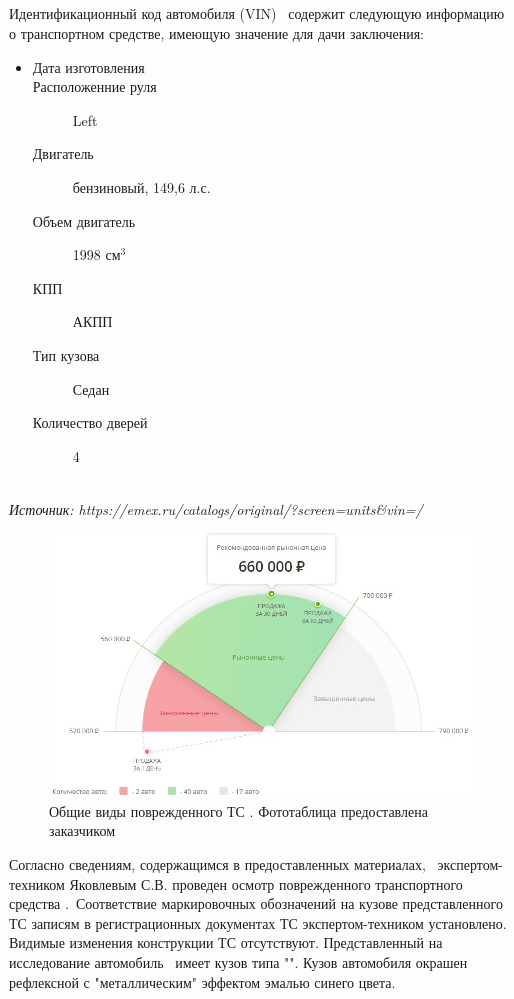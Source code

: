 	\subparagraph*{} Идентификационный код автомобиля (VIN)  \vin \, содержит следующую информацию о транспортном средстве, имеющую значение для 	дачи заключения:\\[3mm]
\noindent\parbox[]{10cm}{
\begin{itemize}
	\item[ ] 
	    \begin{description}
	\item[Дата изготовления] \hfill {}
	\item[Расположенние руля] \hfill Left
	\item[Двигатель] \hfill бензиновый, 149,6 л.с.
	\item[Объем двигатель] \hfill 1998 $ \text{см}^3 $
	\item[КПП] \hfill АКПП
	\item[Тип кузова] \hfill  Седан
	\item[Количество дверей] \hfill 4 
		\end{description}
\end{itemize}}\\%
\vspace{5mm}
\textit{Источник: https://emex.ru/catalogs/original/?screen=units\&vin=/}\\
  \begin{figure}[!h]
	\centering
	\includegraphics[width=0.98\linewidth]{images/1}
	\caption{{\footnotesize {Общие виды поврежденного ТС . Фототаблица предоставлена заказчиком}}}
	\label{ris:images/1}
\end{figure}
 
Согласно сведениям, содержащимся в предоставленных материалах, \osm \, экс\-пертом-техником Яковлевым С.В. проведен осмотр поврежденного транспортного средства \tc.\,
Соответствие маркировочных обозначений на кузове представленного ТС записям в регистрационных документах ТС экс\-пертом-техником установлено. Видимые изменения конструкции ТС отсутствуют.  Представленный на исследование автомобиль \tc\, имеет кузов типа "". Кузов автомобиля окрашен рефлексной %
с "металлическим" эффектом эмалью %
синего цвета.

